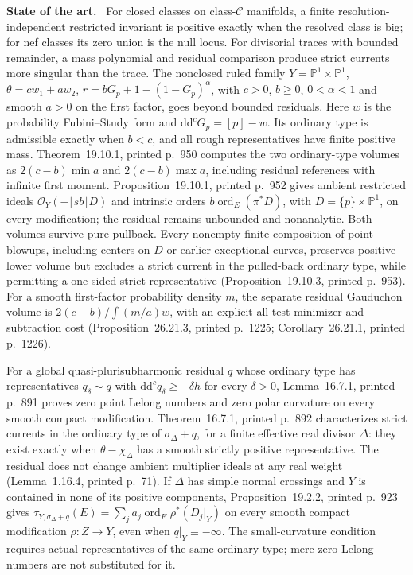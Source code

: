 \documentclass[11pt]{article}
\newcommand{\ddc}{\mathrm d\mathrm d^c}
\newcommand{\field}[1]{\par\medskip\noindent\textbf{#1.}\ }
\begin{document}
\field{State of the art} For closed classes on class-$\mathcal C$ manifolds, a finite resolution-independent restricted invariant is positive exactly when the resolved class is big; for nef classes its zero union is the null locus. For divisorial traces with bounded remainder, a mass polynomial and residual comparison produce strict currents more singular than the trace. The nonclosed ruled family $Y=\mathbb P^1\times\mathbb P^1$, $\theta=cw_1+aw_2$, $r=bG_p+1-(1-G_p)^\alpha$, with $c>0$, $b\geq0$, $0<\alpha<1$ and smooth $a>0$ on the first factor, goes beyond bounded residuals. Here $w$ is the probability Fubini--Study form and $\ddc G_p=[p]-w$. Its ordinary type is admissible exactly when $b<c$, and all rough representatives have finite positive mass. Theorem~19.10.1, printed p.~950 computes the two ordinary-type volumes as $2(c-b)\min a$ and $2(c-b)\max a$, including residual references with infinite first moment. Proposition~19.10.1, printed p.~952 gives ambient restricted ideals $\mathcal O_Y(-\lfloor sb\rfloor D)$ and intrinsic orders $b\operatorname{ord}_E(\pi^*D)$, with $D=\{p\}\times\mathbb P^1$, on every modification; the residual remains unbounded and nonanalytic. Both volumes survive pure pullback. Every nonempty finite composition of point blowups, including centers on $D$ or earlier exceptional curves, preserves positive lower volume but excludes a strict current in the pulled-back ordinary type, while permitting a one-sided strict representative (Proposition~19.10.3, printed p.~953). For a smooth first-factor probability density $m$, the separate residual Gauduchon volume is $2(c-b)/\int(m/a)w$, with an explicit all-test minimizer and subtraction cost (Proposition~26.21.3, printed p.~1225; Corollary~26.21.1, printed p.~1226).\par For a global quasi-plurisubharmonic residual $q$ whose ordinary type has representatives $q_\delta\sim q$ with $\ddc q_\delta\geq-\delta h$ for every $\delta>0$, Lemma~16.7.1, printed p.~891 proves zero point Lelong numbers and zero polar curvature on every smooth compact modification. Theorem~16.7.1, printed p.~892 characterizes strict currents in the ordinary type of $\sigma_\Delta+q$, for a finite effective real divisor $\Delta$: they exist exactly when $\theta-\chi_\Delta$ has a smooth strictly positive representative. The residual does not change ambient multiplier ideals at any real weight (Lemma~1.16.4, printed p.~71). If $\Delta$ has simple normal crossings and $Y$ is contained in none of its positive components, Proposition~19.2.2, printed p.~923 gives $\tau_{Y,\sigma_\Delta+q}(E)=\sum_j a_j\operatorname{ord}_E\rho^*(D_j|_Y)$ on every smooth compact modification $\rho:Z\to Y$, even when $q|_Y\equiv-\infty$. The small-curvature condition requires actual representatives of the same ordinary type; mere zero Lelong numbers are not substituted for it.
\end{document}
